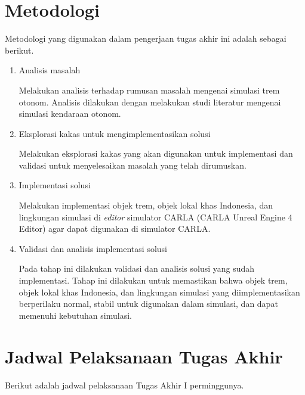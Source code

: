 \section{Metodologi}

Metodologi yang digunakan dalam pengerjaan tugas akhir ini adalah sebagai
berikut.

\begin{enumerate}
	\item Analisis masalah

	Melakukan analisis terhadap rumusan masalah mengenai simulasi trem otonom.
	Analisis dilakukan dengan melakukan studi literatur mengenai simulasi
	kendaraan otonom.

	\item Eksplorasi kakas untuk mengimplementasikan solusi

	Melakukan eksplorasi kakas yang akan digunakan untuk implementasi dan
	validasi untuk menyelesaikan masalah yang telah dirumuskan.

	\item Implementasi solusi

	Melakukan implementasi objek trem, objek lokal khas Indonesia, dan
	lingkungan simulasi di \textit{editor} simulator CARLA (CARLA Unreal Engine
	4 Editor) agar dapat digunakan di simulator CARLA.

	\item Validasi dan analisis implementasi solusi

	Pada tahap ini dilakukan validasi dan analisis solusi yang sudah
	implementasi. Tahap ini dilakukan untuk memastikan bahwa objek trem, objek
	lokal khas Indonesia, dan lingkungan simulasi yang diimplementasikan
	berperilaku normal, stabil untuk digunakan dalam simulasi, dan dapat
	memenuhi kebutuhan simulasi.

\end{enumerate}

\section{Jadwal Pelaksanaan Tugas Akhir}

Berikut adalah jadwal pelaksanaan Tugas Akhir I perminggunya.

